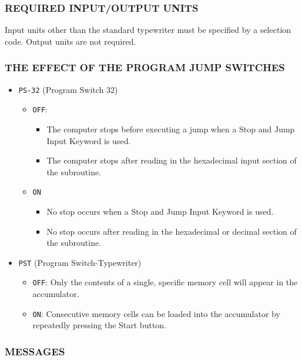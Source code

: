 \documentclass{article}
\begin{document}
\begin{enumerate}
\subsubsection*{REQUIRED INPUT/OUTPUT UNITS}
Input units other than the standard typewriter must be specified by a selection code. Output units are not required.

\subsubsection{THE EFFECT OF THE PROGRAM JUMP SWITCHES}
\begin{itemize}
\item \texttt{PS-32} (Program Switch 32)
\begin{itemize}
\item \texttt{OFF}: 
\begin{itemize}
    \item The computer stops before executing a jump when a Stop and Jump Input Keyword is used.
    \item The computer stops after reading in the hexadecimal input section of the subroutine.
\end{itemize}
\item \texttt{ON}
\begin{itemize}
    \item No stop occurs when a Stop and Jump Input Keyword is used.
    \item No stop occurs after reading in the hexadecimal or decimal section of the subroutine.
\end{itemize}
\end{itemize}
\item \texttt{PST} (Program Switch-Typewriter)
\begin{itemize}
\item \texttt{OFF}: Only the contents of a single, specific memory cell will appear in the accumulator.
\item \texttt{ON}: Consecutive memory cells can be loaded into the accumulator by repeatedly pressing the Start button.
\end{itemize}
\end{itemize}

\subsubsection*{MESSAGES}

\end{enumerate}
\end{document}
